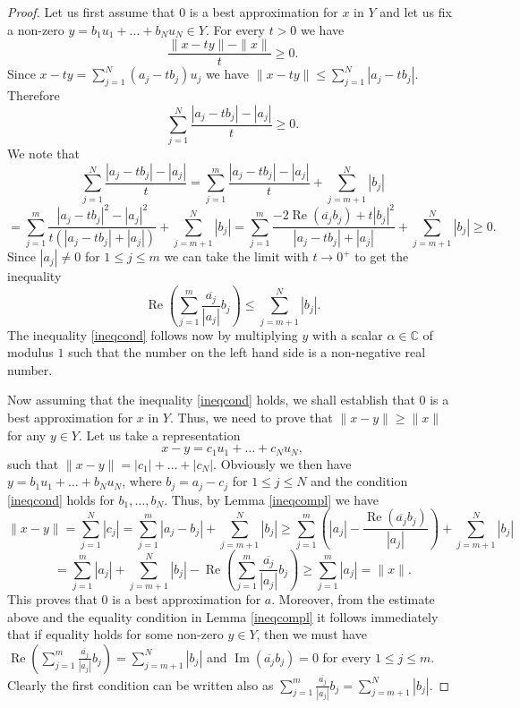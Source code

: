 \documentclass[12pt, reqno]{amsart}
\theoremstyle{definition}
\theoremstyle{remark}
\numberwithin{equation}{section}
\DeclareMathOperator{\re}{Re}
\DeclareMathOperator{\im}{Im}
\begin{document}
\begin{proof}
Let us first assume that $0$ is a best approximation for $x$ in $Y$ and let us fix a non-zero $y=b_1u_1 + \ldots + b_Nu_N \in Y$. For every $t>0$ we have
$$\frac{\|x-ty\| - \|x\|}{t} \geq 0.$$
Since $x-ty = \sum_{j=1}^{N} (a_j - tb_j)u_j$ we have $\|x-ty\| \leq \sum_{j=1}^{N}|a_j - tb_j|$. Therefore
$$\sum_{j=1}^{N} \frac{ |a_j-tb_j| - |a_j|}{t} \geq 0.$$
We note that
$$ \sum_{j=1}^{N} \frac{ |a_j-tb_j| - |a_j|}{t} = \sum_{j=1}^{m} \frac{ |a_j-tb_j| - |a_j|}{t} + \sum_{j=m+1}^{N} |b_j|$$
$$=\sum_{j=1}^{m} \frac{ |a_j-tb_j|^2 - |a_j|^2}{t(|a_j-tb_j| + |a_j|)} + \sum_{j=m+1}^{N} |b_j| = \sum_{j=1}^{m} \frac{ -2\re(\overline{a_j}b_j) + t|b_j|^2}{|a_j-tb_j| + |a_j|} + \sum_{j=m+1}^{N} |b_j| \geq 0.$$
Since $|a_j| \neq 0$ for $1 \leq j \leq m$ we can take the limit with $t \to 0^+$ to get the inequality
$$\re \left ( \sum_{j=1}^{m} \frac{\overline{a_j}}{|a_j|} b_j  \right ) \leq \sum_{j=m+1}^{N} |b_j|.$$
The inequality \eqref{ineqcond} follows now by multiplying $y$ with a scalar $\alpha \in \mathbb{C}$ of modulus $1$ such that the number on the left hand side is a non-negative real number.

Now assuming that the inequality \eqref{ineqcond} holds, we shall establish that $0$ is a best approximation for $x$ in $Y$. Thus, we need to prove that $\|x-y\| \geq \|x\|$ for any $y \in Y$. Let us take a representation
$$x-y = c_1u_1 + \ldots + c_Nu_N,$$
such that $\|x-y\| = |c_1| + \ldots + |c_N|$. Obviously we then have $y = b_1u_1 + \ldots + b_Nu_N$, where $b_j = a_j - c_j$ for $1 \leq j \leq N$ and the condition \eqref{ineqcond} holds for $b_1, \ldots, b_N$. Thus, by Lemma \ref{ineqcompl} we have
$$\|x-y\| = \sum_{j=1}^{N} |c_j| = \sum_{j=1}^{m} |a_j-b_j| + \sum_{j=m+1}^{N} |b_j| \geq \sum_{j=1}^{m} \left ( |a_j| - \frac{\re(\overline{a_j}b_j)} {|a_j|} \right ) + \sum_{j=m+1}^{N} |b_j|$$
$$= \sum_{j=1}^{m} |a_j| + \sum_{j=m+1}^{N} |b_j| - \re \left ( \sum_{j=1}^{m} \frac{\overline{a_j}}{|a_j|} b_j  \right ) \geq \sum_{j=1}^{m} |a_j| = \|x\|. $$
This proves that $0$ is a best approximation for $a$. Moreover, from the estimate above and the equality condition in Lemma \ref{ineqcompl} it follows immediately that if equality holds for some non-zero $y \in Y$, then we must have $\re \left ( \sum_{j=1}^{m} \frac{\overline{a_j}}{|a_j|} b_j  \right ) = \sum_{j=m+1}^{N} |b_j|$ and $\im(\overline{a_j}b_j)=0$ for every $1 \leq j \leq m$. Clearly the first condition can be written also as $ \sum_{j=1}^{m} \frac{\overline{a_j}}{|a_j|} b_j = \sum_{j=m+1}^{N} |b_j|$.


\end{proof}
\end{document}
